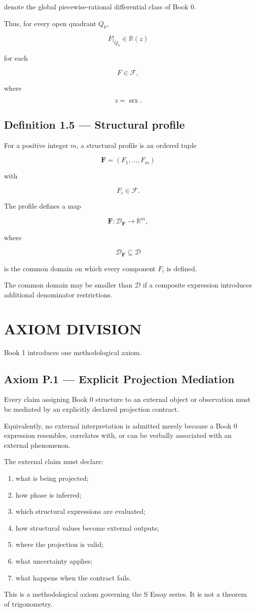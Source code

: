\documentclass[11pt,oneside,openany]{book}
\newcommand{\PCsection}[1]{%
  \section*{#1}\addcontentsline{toc}{section}{#1}%
}
\newcommand{\PCsubsection}[1]{%
  \subsection*{#1}%
}
\begin{document}
denote the global piecewise-rational differential class of Book 0.

Thus, for every open quadrant \(Q_k\),

\[
F|_{Q_k}\in\mathbb R(z)
\]

for each

\[
F\in\mathscr F,
\]

where

\[
z=\operatorname{srx}.
\]

\PCsubsection{Definition 1.5 --- Structural profile}

For a positive integer \(m\), a structural profile is an ordered tuple

\[
\boxed{ \mathbf F = (F_1,\ldots,F_m) }
\]

with

\[
F_i\in\mathscr F.
\]

The profile defines a map

\[
\mathbf F:\mathcal D_{\mathbf F}\to\mathbb R^m,
\]

where

\[
\mathcal D_{\mathbf F} \subseteq \mathcal D
\]

is the common domain on which every component \(F_i\) is defined.

The common domain may be smaller than \(\mathcal D\) if a composite expression introduces additional denominator restrictions.


\PCsection{AXIOM DIVISION}

Book 1 introduces one methodological axiom.

\PCsubsection{Axiom P.1 --- Explicit Projection Mediation}

Every claim assigning Book 0 structure to an external object or observation must be mediated by an explicitly declared projection contract.

Equivalently, no external interpretation is admitted merely because a Book 0 expression resembles, correlates with, or can be verbally associated with an external phenomenon.

The external claim must declare:

\begin{enumerate}
\item what is being projected;
\item how phase is inferred;
\item which structural expressions are evaluated;
\item how structural values become external outputs;
\item where the projection is valid;
\item what uncertainty applies;
\item what happens when the contract fails.
\end{enumerate}
This is a methodological axiom governing the S Essay series. It is not a theorem of trigonometry.
\end{document}

